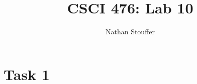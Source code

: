 \documentclass[11pt]{article}
\begin{document}
\title{CSCI 476: Lab 10}
\author{Nathan Stouffer}
\maketitle
\newpage

\newpage
\section*{Task 1}
\end{document}
